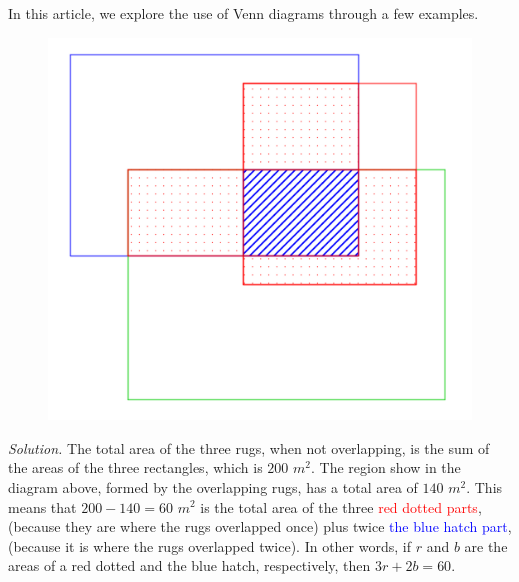 \begin{multicols}{2}
	In this article, we explore the use of Venn diagrams through a few examples.
	\vskip 0.2cm
	\begin{figure}[H]
		\vspace*{-5pt}
		\centering
		\captionsetup{labelformat= empty, justification=centering}
		\includegraphics[width= 1\linewidth]{pi-2023-01-01.pdf}
		\vspace*{-15pt}
	\end{figure}
	\textit{Solution.}
	The total area of the three rugs, when not overlapping, is the sum of the areas of the three rectangles, which is $200$ $m^2.$
	The region show in the diagram above, formed by the overlapping rugs, has a total area of $140$ $m^2.$
	This means that $200-140=60$ $m^2$ is the total area of the three \textcolor{red}{red dotted parts},
	(because they are where the rugs overlapped once) plus twice \textcolor{blue}{the blue hatch part},
	(because it is where the rugs overlapped twice).
	\vskip 0.1cm
	In other words, if $r$ and $b$ are the areas of a red dotted and the blue hatch, respectively, then $3r + 2b = 60.$

\end{multicols}
